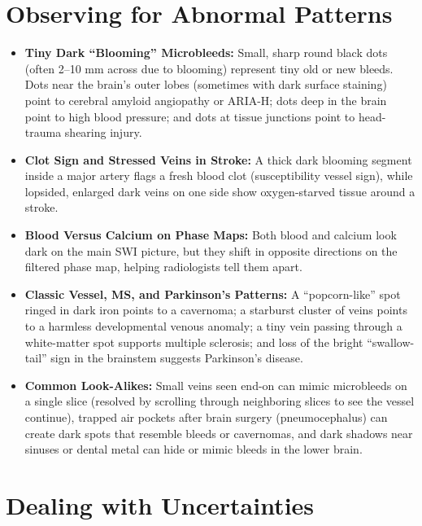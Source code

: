 \section{Observing for Abnormal Patterns}

\begin{itemize}
    \item \textbf{Tiny Dark ``Blooming'' Microbleeds:} Small, sharp round black dots (often 2--10 mm across due to blooming) represent tiny old or new bleeds. Dots near the brain's outer lobes (sometimes with dark surface staining) point to cerebral amyloid angiopathy or ARIA-H; dots deep in the brain point to high blood pressure; and dots at tissue junctions point to head-trauma shearing injury.
    \item \textbf{Clot Sign and Stressed Veins in Stroke:} A thick dark blooming segment inside a major artery flags a fresh blood clot (susceptibility vessel sign), while lopsided, enlarged dark veins on one side show oxygen-starved tissue around a stroke.
    \item \textbf{Blood Versus Calcium on Phase Maps:} Both blood and calcium look dark on the main SWI picture, but they shift in opposite directions on the filtered phase map, helping radiologists tell them apart.
    \item \textbf{Classic Vessel, MS, and Parkinson's Patterns:} A ``popcorn-like'' spot ringed in dark iron points to a cavernoma; a starburst cluster of veins points to a harmless developmental venous anomaly; a tiny vein passing through a white-matter spot supports multiple sclerosis; and loss of the bright ``swallow-tail'' sign in the brainstem suggests Parkinson's disease.
    \item \textbf{Common Look-Alikes:} Small veins seen end-on can mimic microbleeds on a single slice (resolved by scrolling through neighboring slices to see the vessel continue), trapped air pockets after brain surgery (pneumocephalus) can create dark spots that resemble bleeds or cavernomas, and dark shadows near sinuses or dental metal can hide or mimic bleeds in the lower brain.
\end{itemize}

\section{Dealing with Uncertainties}

